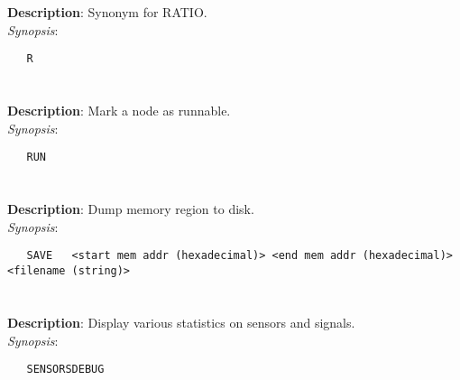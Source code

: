 \section{\quad{}}
\label{manpages:R}
\label{manpages:r}
\vspace{-0.1in}
{\bf Description}: 	Synonym for RATIO.\\[1.5ex]
{\em Synopsis}:
\vspace{-0.05in}
\scriptsize
\begin{lstlisting}
   R   												
\end{lstlisting}
\normalsize
\vspace{-0.05in}


\section{\quad{}}
\label{manpages:RUN}
\label{manpages:run}
\vspace{-0.1in}
{\bf Description}: 	Mark a node as runnable.\\[1.5ex]
{\em Synopsis}:
\vspace{-0.05in}
\scriptsize
\begin{lstlisting}
   RUN   											
\end{lstlisting}
\normalsize
\vspace{-0.05in}


\section{\quad{}}
\label{manpages:SAVE}
\label{manpages:save}
\vspace{-0.1in}
{\bf Description}: 	Dump memory region to disk.\\[1.5ex]
{\em Synopsis}:
\vspace{-0.05in}
\scriptsize
\begin{lstlisting}
   SAVE   <start mem addr (hexadecimal)> <end mem addr (hexadecimal)> <filename (string)>	
\end{lstlisting}
\normalsize
\vspace{-0.05in}


\section{\quad{}}
\label{manpages:SENSORSDEBUG}
\label{manpages:sensorsdebug}
\vspace{-0.1in}
{\bf Description}: 	Display various statistics on sensors and signals.\\[1.5ex]
{\em Synopsis}:
\vspace{-0.05in}
\scriptsize
\begin{lstlisting}
   SENSORSDEBUG    																		
\end{lstlisting}
\normalsize
\vspace{-0.05in}



